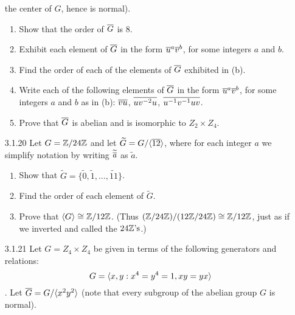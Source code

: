 \begin{enumerate}
                  the center of $G$, hence is normal).
                  \begin{enumerate}
                     \item Show that the order of $\overline{G}$ is 8.
                     \item Exhibit each element of $\overline{G}$ in the form
                           $\overline{u}^a\overline{v}^b$, for some integers $a$ and $b$.
                     \item Find the order of each of the elements of $\overline{G}$
                           exhibited in (b).
                     \item Write each of the following elements of $\overline{G}$ in
                           the form $\overline{u}^a\overline{v}^b$, for some integers $a$ and
                           $b$ as in (b): \quad $\overline{vu}$, \quad $\overline{uv^{-2}u}$,
                           \quad $\overline{u^{-1}v^{-1}uv}$.
                     \item Prove that $\overline{G}$ is abelian and is isomorphic to
                           $Z_2 \times Z_4$.
                  \end{enumerate}
   \item[3.1.20]  Let $G = \mathbb{Z}/24\mathbb{Z}$ and let
                  $\widetilde{G} = G/\langle \overline{12} \rangle$, where for each integer $a$
                  we simplify notation by writing $\widetilde{\overline{a}}$ as
                  $\widetilde{a}$.
                  \begin{enumerate}
                     \item Show that $\widetilde{G} = \{\widetilde{0},
                           \widetilde{1}, \ldots, \widetilde{11}\}$.
                     \item Find the order of each element of $\widetilde{G}$.
                     \item Prove that $\langle G \rangle \cong \mathbb{Z}/12\mathbb{Z}$. (Thus
                           $(\mathbb{Z}/24\mathbb{Z})/(12\mathbb{Z}/24\mathbb{Z}) \cong \mathbb{Z}/12\mathbb{Z}$, just as if we
                           inverted and called the $24\mathbb{Z}\text{'s}$.)
                  \end{enumerate}
   \item[3.1.21]  Let $G = Z_4 \times Z_4$ be given in terms of the following
                  generators and relations:
                  $$G = \langle x, y : x^4 = y^4 = 1, xy = yx \rangle$$.
                  Let $\overline{G} = G/\langle x^2y^2 \rangle$ (note that every subgroup of the
                  abelian group $G$ is normal).

\end{enumerate}

